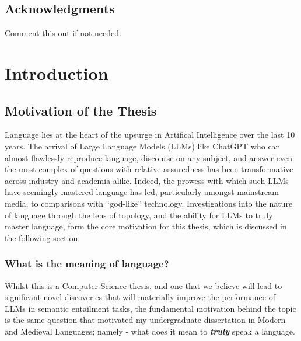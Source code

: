 \documentclass[12pt,twoside]{report}
\begin{document}
\section*{Acknowledgments}
Comment this out if not needed.

\clearpage{\pagestyle{empty}\cleardoublepage}

\tableofcontents 


\clearpage{\pagestyle{empty}\cleardoublepage}
\setcounter{page}{1}
\fancyhead[LE,RO]{\slshape \rightmark}
\fancyhead[LO,RE]{\slshape \leftmark}

\chapter{Introduction}
\section{Motivation of the Thesis}
Language lies at the heart of the upsurge in Artifical Intelligence over the last 10 years. The arrival of Large Language Models (LLMs) like ChatGPT who can almost flawlessly reproduce language, discourse on any subject, and answer even the most complex of questions with relative assuredness has been transformative across industry and academia alike. Indeed, the prowess with which such LLMs have seemingly mastered language has led, particularly amongst mainstream media, to comparisons with ``god-like'' technology. \cite{hogarthFT} Investigations into the nature of language through the lens of topology, and the ability for LLMs to truly master language, form the core motivation for this thesis, which is discussed in the following section. 


\subsection{What is the meaning of language?}

Whilst this is a Computer Science thesis, and one that we believe will lead to significant novel discoveries that will materially improve the performance of LLMs in semantic entailment tasks, the fundamental motivation behind the topic is the same question that motivated my undergraduate dissertation in Modern and Medieval Languages; namely - what does it mean to \textbf{\textit{truly}} speak a language. \newline \par
\end{document}
